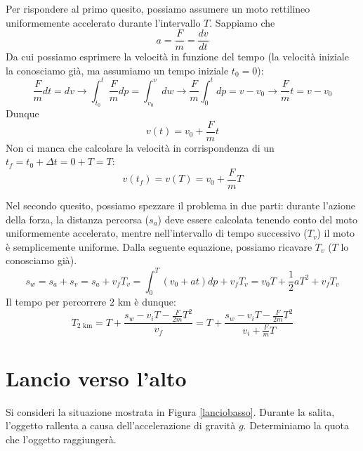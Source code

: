 Per rispondere al primo quesito, possiamo assumere un moto rettilineo
uniformemente accelerato durante l'intervallo $T$. Sappiamo che \[ a = \frac{F}{m} = \frac{dv}{dt} \]
Da cui possiamo esprimere la velocità in funzione del tempo (la velocità
iniziale la conosciamo già, ma assumiamo un tempo iniziale $t_0 = 0$):
\[ \frac{F}{m}dt = dv \to \int_{t_0}^{t}\frac{F}{m}dp = \int_{v_0}^{v}dw \to \frac{F}{m}\int_{0}^{t}dp = v - v_0 \to \frac{F}{m}t = v - v_0 \]
Dunque
\[ v(t) = v_0 + \frac{F}{m}t \]
Non ci manca che calcolare la velocità in corrispondenza di un $t_f = t_0 + \Delta t = 0 + T = T$:
\[ v(t_f) = v(T) = v_0 + \frac{F}{m}T \]

Nel secondo quesito, possiamo spezzare il problema in due parti: durante
l'azione della forza, la distanza percorsa ($s_a$) deve essere calcolata tenendo
conto del moto uniformemente accelerato, mentre nell'intervallo di tempo
successivo ($T_v$) il moto è semplicemente uniforme. Dalla seguente equazione,
possiamo ricavare $T_v$ ($T$ lo conosciamo già).
\[ s_w = s_a + s_v = s_a + v_fT_v = \int_{0}^{T}(v_0 + at)dp + v_fT_v = v_0T + \frac{1}{2}aT^2 + v_fT_v \]
Il tempo per percorrere $2\text{ km}$ è dunque:
\[ T_{2\text{ km}} = T + \frac{s_w - v_iT - \frac{F}{2m}T^2}{v_f} = T + \frac{s_w - v_iT - \frac{F}{2m}T^2}{v_i + \frac{F}{m}T} \]

\section{Lancio verso l'alto}
Si consideri la situazione mostrata in Figura \ref{lanciobasso}.
Durante la salita, l'oggetto rallenta a causa dell'accelerazione di gravità $g$.
Determiniamo la quota che l'oggetto raggiungerà.

